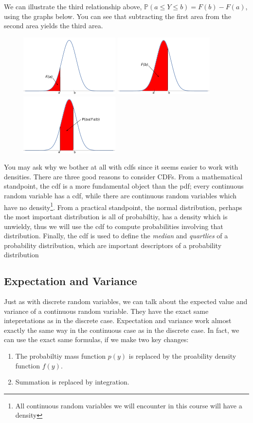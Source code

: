\documentclass[12pt]{article}
\theoremstyle{definition}
\theoremstyle{remark}
\def\P{{\mathbb P}}
\begin{document}
We can illustrate the third relationship above, $\P(a \leq Y \leq b) = F(b) - F(a)$, using the graphs below. You can see that subtracting the first area from the second area yields the third area.
\begin{figure}[H]
\centering
\includegraphics[width=5cm]{normalcdfFa.pdf}
\includegraphics[width=5cm]{normalcdfFb.pdf}
\includegraphics[width=5cm]{normalcdfPab.pdf}
\end{figure}

You may ask why we bother at all with cdfs since it seems easier to work with densities. There are three good reasons to consider CDFs. From a mathematical standpoint, the cdf is a more fundamental object than the pdf; every continuous random variable has a cdf, while there are continuous random variables which have no density\footnote{All continuous random variables we will encounter in this course will have a density}. From a practical standpoint, the normal distribution, perhaps the most important distribution is all of probabiltiy, has a density which is unwieldy, thus we will use the cdf to compute probabilities involving that distribution. Finally, the cdf is used to define the \emph{median} and \emph{quartlies} of a probability distribution, which are important descriptors of a probability distribution

\subsection{Expectation and Variance}
Just as with discrete random variables, we can talk about the expected value and variance of a continuous random variable. They have the exact same intepretations as in the discrete case. Expectation and variance work almost exactly the same way in the continuous case as in the discrete case. In fact, we can use the exact same formulas, if we make two key changes:
\begin{enumerate}
\item The probabiltiy mass function $p(y)$ is replaced by the proability density function $f(y)$.
\item Summation is replaced by integration.
\end{enumerate}
\end{document}
